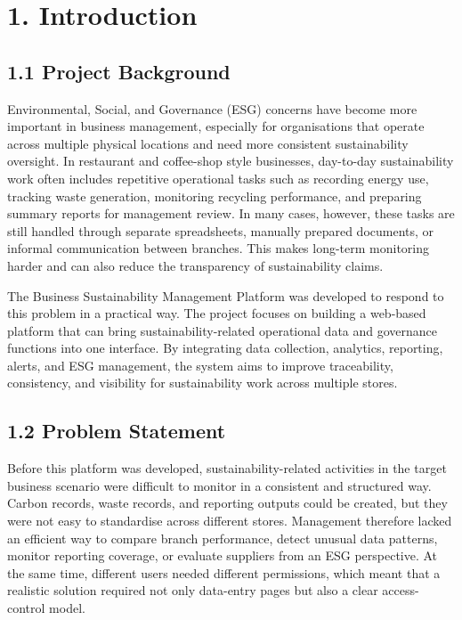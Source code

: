 \documentclass[10pt,a4paper]{article}
\begin{document}
\section*{1. Introduction}

\subsection*{1.1 Project Background}
Environmental, Social, and Governance (ESG) concerns have become more important in business management, especially for organisations that operate across multiple physical locations and need more consistent sustainability oversight. In restaurant and coffee-shop style businesses, day-to-day sustainability work often includes repetitive operational tasks such as recording energy use, tracking waste generation, monitoring recycling performance, and preparing summary reports for management review. In many cases, however, these tasks are still handled through separate spreadsheets, manually prepared documents, or informal communication between branches. This makes long-term monitoring harder and can also reduce the transparency of sustainability claims.

The Business Sustainability Management Platform was developed to respond to this problem in a practical way. The project focuses on building a web-based platform that can bring sustainability-related operational data and governance functions into one interface. By integrating data collection, analytics, reporting, alerts, and ESG management, the system aims to improve traceability, consistency, and visibility for sustainability work across multiple stores.

\subsection*{1.2 Problem Statement}
Before this platform was developed, sustainability-related activities in the target business scenario were difficult to monitor in a consistent and structured way. Carbon records, waste records, and reporting outputs could be created, but they were not easy to standardise across different stores. Management therefore lacked an efficient way to compare branch performance, detect unusual data patterns, monitor reporting coverage, or evaluate suppliers from an ESG perspective. At the same time, different users needed different permissions, which meant that a realistic solution required not only data-entry pages but also a clear access-control model.
\end{document}
